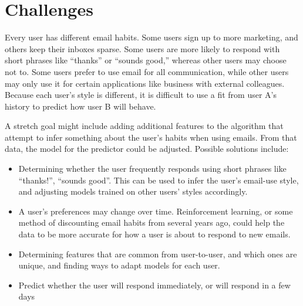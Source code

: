 \documentclass{article}
\begin{document}
\section{Challenges}
Every user has different email habits. Some users sign up to more marketing, and others keep their inboxes sparse. Some users are more likely to respond with short phrases like ``thanks'' or ``sounds good,'' whereas other users may choose not to. Some users prefer to use email for all communication, while other users may only use it for certain applications like business with external colleagues. Because each user's style is different, it is difficult to use a fit from user A's history to predict how user B will behave.

A stretch goal might include adding additional features to the algorithm that attempt to infer something about the user's habits when using emails. From that data, the model for the predictor could be adjusted. Possible solutions include:

\begin{itemize}
\item Determining whether the user frequently responds using short phrases like ``thanks!'', ``sounds good''. This can be used to infer the user's email-use style, and adjusting models trained on other users' styles accordingly.
\item A user's preferences may change over time. Reinforcement learning, or some method of discounting email habits from several years ago, could help the data to be more accurate for how a user is about to respond to new emails.
\item Determining features that are common from user-to-user, and which ones are unique, and finding ways to adapt models for each user.
\item Predict whether the user will respond immediately, or will respond in a few days
\end{itemize}

 

\end{document}

